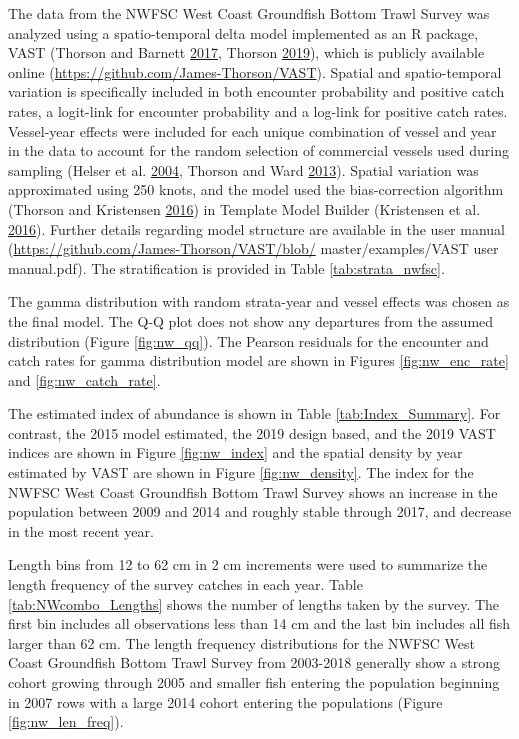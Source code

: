 \documentclass[12pt,]{article}
\begin{document}
The data from the NWFSC West Coast Groundfish Bottom Trawl Survey was
analyzed using a spatio-temporal delta model implemented as an R
package, VAST (Thorson and Barnett
\protect\hyperlink{ref-thorson_comparing_2017}{2017}, Thorson
\protect\hyperlink{ref-thorson_guidance_2019}{2019}), which is publicly
available online (\url{https://github.com/James-Thorson/VAST}). Spatial
and spatio-temporal variation is specifically included in both encounter
probability and positive catch rates, a logit-link for encounter
probability and a log-link for positive catch rates. Vessel-year effects
were included for each unique combination of vessel and year in the data
to account for the random selection of commercial vessels used during
sampling (Helser et al.
\protect\hyperlink{ref-helser_generalized_2004}{2004}, Thorson and Ward
\protect\hyperlink{ref-thorson_accounting_2013}{2013}). Spatial
variation was approximated using 250 knots, and the model used the
bias-correction algorithm (Thorson and Kristensen
\protect\hyperlink{ref-thorson_implementing_2016}{2016}) in Template
Model Builder (Kristensen et al.
\protect\hyperlink{ref-kristensen_tmb:_2016}{2016}). Further details
regarding model structure are available in the user manual
(\url{https://github.com/James-Thorson/VAST/blob/} master/examples/VAST
user manual.pdf). The stratification is provided in Table
\ref{tab:strata_nwfsc}.

The gamma distribution with random strata-year and vessel effects was
chosen as the final model. The Q-Q plot does not show any departures
from the assumed distribution (Figure \ref{fig:nw_qq}). The Pearson
residuals for the encounter and catch rates for gamma distribution model
are shown in Figures \ref{fig:nw_enc_rate} and \ref{fig:nw_catch_rate}.

The estimated index of abundance is shown in Table
\ref{tab:Index_Summary}. For contrast, the 2015 model estimated, the
2019 design based, and the 2019 VAST indices are shown in Figure
\ref{fig:nw_index} and the spatial density by year estimated by VAST are
shown in Figure \ref{fig:nw_density}. The index for the NWFSC West Coast
Groundfish Bottom Trawl Survey shows an increase in the population
between 2009 and 2014 and roughly stable through 2017, and decrease in
the most recent year.

Length bins from 12 to 62 cm in 2 cm increments were used to summarize
the length frequency of the survey catches in each year. Table
\ref{tab:NWcombo_Lengths} shows the number of lengths taken by the
survey. The first bin includes all observations less than 14 cm and the
last bin includes all fish larger than 62 cm. The length frequency
distributions for the NWFSC West Coast Groundfish Bottom Trawl Survey
from 2003-2018 generally show a strong cohort growing through 2005 and
smaller fish entering the population beginning in 2007 rows with a large
2014 cohort entering the populations (Figure \ref{fig:nw_len_freq}).
\end{document}
